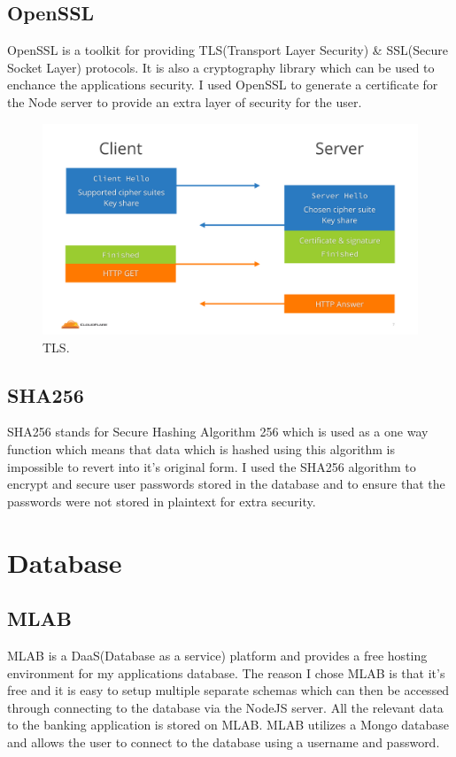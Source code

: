 \subsection{OpenSSL}
OpenSSL is a toolkit for providing TLS(Transport Layer Security) \& SSL(Secure Socket Layer) protocols.  It is also a cryptography library which can be used to enchance the applications security.  I used OpenSSL to generate a certificate for the Node server to provide an extra layer of security for the user.
\\
\begin{figure}[H]
  \includegraphics[width=\textwidth]{img/tls.png}
  \caption{TLS.}
  \label{fig: How TLS Works}
\end{figure}
\cite{TLS}
\subsection{SHA256}
SHA256 stands for Secure Hashing Algorithm 256 which is used as a one way function which means that data which is hashed using this algorithm is impossible to revert into it's original form\cite{SHA256}.  I used the SHA256 algorithm to encrypt and secure user passwords stored in the database and to ensure that the passwords were not stored in plaintext for extra security.
\section{Database}
\subsection{MLAB}
MLAB is a DaaS(Database as a service) platform and provides a free hosting environment for my applications database\cite{MLAB}.  The reason I chose MLAB is that it's free and it is easy to setup multiple separate schemas which can then be accessed through connecting to the database via the NodeJS server.  All the relevant data to the banking application is stored on MLAB.  MLAB utilizes a Mongo database and allows the user to connect to the database using a username and password.
